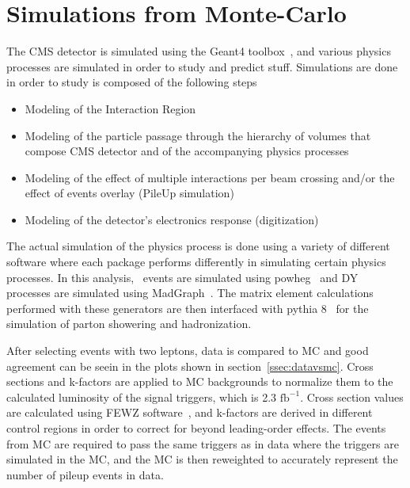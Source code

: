 \clearpage

\section{Simulations from Monte-Carlo}
The CMS detector is simulated using the Geant4 toolbox~\cite{Geant}, and various physics processes are simulated in order to study and predict stuff.
Simulations are done in order to study is composed of the following steps
\begin{itemize}
\item Modeling of the Interaction Region
\item Modeling of the particle passage through the hierarchy of volumes that compose CMS detector and of the accompanying physics processes
\item Modeling of the effect of multiple interactions per beam crossing and/or the effect of events overlay (PileUp simulation)
\item Modeling of the detector's electronics response (digitization)
\end{itemize}

The actual simulation of the physics process is done using a variety of different software where each package performs differently in simulating certain physics processes.
In this analysis, \ttbar\ events are simulated using powheg~\cite{powheg} and DY processes are simulated using MadGraph~\cite{aMCatNLO}.
The matrix element calculations performed with these generators are then interfaced with pythia 8~\cite{Pythia} for the simulation of parton showering and hadronization.

After selecting events with two leptons, data is compared to MC and good agreement can be seein in the plots shown in section~\ref{ssec:datavsmc}.
Cross sections and k-factors are applied to MC backgrounds to normalize them to the calculated luminosity of the signal triggers, which is 2.3 $\mathrm{fb^{-1}}$.
Cross section values are calculated using FEWZ software~\cite{Li:2012wna},
and k-factors are derived in different control regions in order to correct for beyond leading-order effects. %
The events from MC are required to pass the same triggers as in data where the triggers are simulated in the MC,
and the MC is then reweighted to accurately represent the number of pileup events in data.

